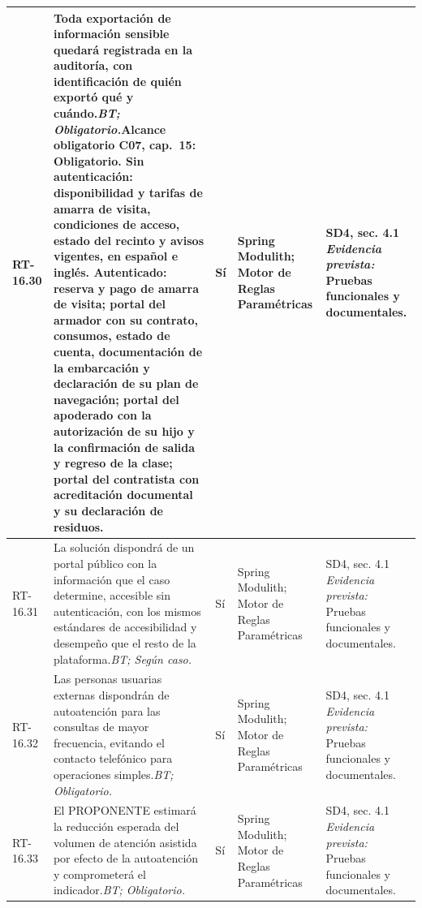 \begin{paginaHorizontalSynaptix}
\begin{longtable}{|L{0.09\AnchoMatrizTDoce}|L{0.385\AnchoMatrizTDoce}|L{0.065\AnchoMatrizTDoce}|L{0.18\AnchoMatrizTDoce}|L{0.28\AnchoMatrizTDoce}|}
RT-\allowbreak{}16.\allowbreak{}30 &
Toda exportación de información sensible quedará registrada en la auditoría, con identificación de quién exportó qué y cuándo.\newline\textit{BT; Obligatorio.}\newline\textbf{Alcance obligatorio C07, cap.~15:} Obligatorio. Sin autenticación: disponibilidad y tarifas de amarra de visita, condiciones de acceso, estado del recinto y avisos vigentes, en español e inglés. Autenticado: reserva y pago de amarra de visita; portal del armador con su contrato, consumos, estado de cuenta, documentación de la embarcación y declaración de su plan de navegación; portal del apoderado con la autorización de su hijo y la confirmación de salida y regreso de la clase; portal del contratista con acreditación documental y su declaración de residuos. &
Sí &
Spring Modulith; Motor de Reglas Paramétricas &
SD4, sec. 4.1 \newline\textit{Evidencia prevista:} Pruebas funcionales y documentales. \\ \hline

RT-\allowbreak{}16.\allowbreak{}31 &
La solución dispondrá de un portal público con la información que el caso determine, accesible sin autenticación, con los mismos estándares de accesibilidad y desempeño que el resto de la plataforma.\newline\textit{BT; Según caso.} &
Sí &
Spring Modulith; Motor de Reglas Paramétricas &
SD4, sec. 4.1 \newline\textit{Evidencia prevista:} Pruebas funcionales y documentales. \\ \hline

RT-\allowbreak{}16.\allowbreak{}32 &
Las personas usuarias externas dispondrán de autoatención para las consultas de mayor frecuencia, evitando el contacto telefónico para operaciones simples.\newline\textit{BT; Obligatorio.} &
Sí &
Spring Modulith; Motor de Reglas Paramétricas &
SD4, sec. 4.1 \newline\textit{Evidencia prevista:} Pruebas funcionales y documentales. \\ \hline

RT-\allowbreak{}16.\allowbreak{}33 &
El PROPONENTE estimará la reducción esperada del volumen de atención asistida por efecto de la autoatención y comprometerá el indicador.\newline\textit{BT; Obligatorio.} &
Sí &
Spring Modulith; Motor de Reglas Paramétricas &
SD4, sec. 4.1 \newline\textit{Evidencia prevista:} Pruebas funcionales y documentales. \\ \hline


\end{longtable}
\end{paginaHorizontalSynaptix}

